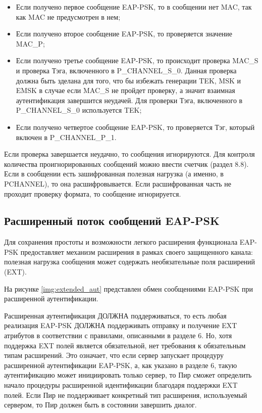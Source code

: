 \begin{itemize}
\item Если получено первое сообщение EAP-PSK, то в сообщении нет MAC, так как MAC не предусмотрен в нем;
\item Если получено второе сообщение EAP-PSK, то проверяется значение MAC\_P;
\item Если получено третье сообщение EAP-PSK, то происходит проверка MAC\_S и проверка Тэга, включенного в P\_CHANNEL\_S\_0. Данная проверка должна быть зделана для того, что бы избежать генерации TEK, MSK и EMSK в случае если MAC\_S не пройдет проверку, а значит взаимная аутентификация завершится неудачей. Для проверки Тэга, включенного в P\_CHANNEL\_S\_0 используется TEK;
\item Если получено четвертое сообщение EAP-PSK, то проверяется Тэг, который включен в P\_CHANNEL\_P\_1.
\end{itemize}

Если проверка завершается неудачно, то сообщения игнорируются. Для контроля количества проигнорированных сообщений можно ввести счетчик (раздел 8.8). Если в сообщении есть зашифрованная полезная нагрузка (а именно, в PCHANNEL), то она расшифровывается. Если расшифрованная часть не проходит проверку формата, то сообщение игнорируется.

\subsection{Расширенный поток сообщений EAP-PSK}

Для сохранения простоты и возможности легкого расширения функционала EAP-PSK предоставляет механизм расширения в рамках своего защищенного канала: полезная нагрузка сообщения может содержать необязательные поля расширений (EXT).

На рисунке \ref{img:extended_aut} представлен обмен сообщениями EAP-PSK при расширенной аутентификации.

Расширенная аутентификация ДОЛЖНА поддерживаться, то есть любая реализация EAP-PSK ДОЛЖНА поддерживать отправку и получение EXT атрибутов в соответствии с правилами, описанными в разделе 6. Но, хотя поддержка EXT полей является обязательной, нет требования к обязательным типам расширений. Это означает, что если сервер запускает процедуру расширенной аутентификации EAP-PSK, а, как указано в разделе 6, такую аутентификацию может инициировать только сервер, то Пир сможет определить начало процедуры расширенной идентификации благодаря поддержки EXT полей. Если Пир не поддерживает конкретный тип расширения, используемый сервером, то Пир должен быть в состоянии завершить диалог.

